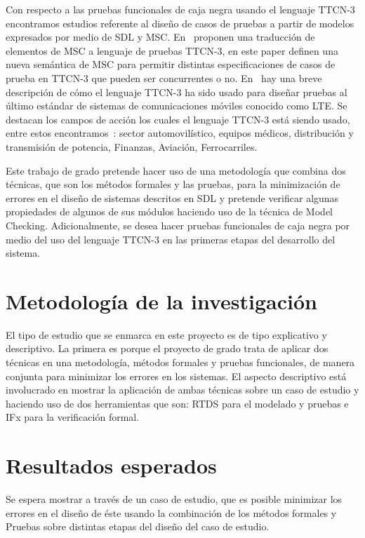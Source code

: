 Con respecto a las pruebas funcionales de caja negra usando el lenguaje TTCN-3 encontramos estudios referente al diseño de casos de pruebas a partir de modelos expresados por medio de SDL y MSC. En~\cite{Ebner} proponen una traducci\'on de elementos de MSC a lenguaje de pruebas TTCN-3, en este paper definen una nueva sem\'antica de MSC para permitir distintas especificaciones de casos de prueba en TTCN-3 que pueden ser concurrentes o no. En~\cite{Willcock2011} hay una breve descripci\'on de c\'omo el lenguaje TTCN-3 ha sido usado para diseñar pruebas al \'ultimo est\'andar de sistemas de comunicaciones m\'oviles conocido como LTE. Se destacan los campos de acci\'on los cuales el lenguaje TTCN-3 est\'a siendo usado, entre estos encontramos~\cite{Schieferdecker}: sector automovil\'istico,  equipos m\'edicos, distribuci\'on y transmisi\'on de potencia, Finanzas, Aviaci\'on, Ferrocarriles.

Este trabajo de grado pretende hacer uso de una metodolog\'ia que combina dos t\'ecnicas, que son los m\'etodos formales y las pruebas, para la minimizaci\'on de errores en el diseño de sistemas descritos en SDL y pretende verificar algunas propiedades de algunos de sus m\'odulos haciendo uso de la t\'ecnica de Model Checking. Adicionalmente, se desea hacer pruebas funcionales de caja negra por medio del uso del lenguaje TTCN-3 en las primeras etapas del desarrollo del sistema.
 


\section{Metodolog\'ia de la investigaci\'on}

El tipo de estudio que se enmarca en este proyecto es de tipo explicativo y 
descriptivo. La primera es porque el proyecto de grado trata de aplicar dos 
t\'ecnicas en una metodolog\'ia, m\'etodos formales y pruebas funcionales, de manera conjunta 
para minimizar los errores en los sistemas. El aspecto descriptivo est\'a 
involucrado en mostrar la aplicaci\'on de ambas t\'ecnicas sobre un caso de 
estudio y haciendo uso de dos herramientas que son: RTDS para el modelado y 
pruebas e IFx para la verificaci\'on formal.

\section{Resultados esperados}

Se espera mostrar a trav\'es de un caso de estudio, que es posible minimizar los 
errores en el dise\~no de \'este usando la combinaci\'on de los m\'etodos 
formales y Pruebas sobre distintas etapas del dise\~no del caso de estudio.

